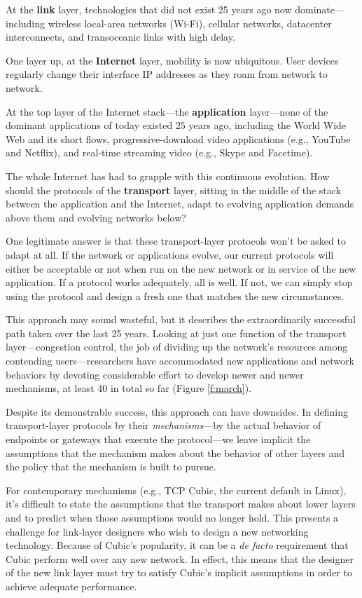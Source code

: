 At the \textbf{link} layer, technologies that did not exist 25 years
ago now dominate---including wireless local-area networks (Wi-Fi),
cellular networks, datacenter interconnects, and transoceanic links
with high delay.

One layer up, at the \textbf{Internet} layer, mobility is now
ubiquitous. User devices regularly change their interface IP addresses
as they roam from network to network.

At the top layer of the Internet stack---the \textbf{application}
layer---none of the dominant applications of today existed 25 years
ago, including the World Wide Web and its short flows,
progressive-download video applications (e.g., YouTube and Netflix),
and real-time streaming video (e.g., Skype and Facetime).

The whole Internet has had to grapple with this continuous
evolution. How should the protocols of the \textbf{transport} layer,
sitting in the middle of the stack between the application and the
Internet, adapt to evolving application demands above them and
evolving networks below?

One legitimate answer is that these transport-layer protocols won't be
asked to adapt at all. If the network or applications evolve, our
current protocols will either be acceptable or not when run on the new
network or in service of the new application. If a protocol works
adequately, all is well. If not, we can simply stop using the protocol
and design a fresh one that matches the new circumstances.

This approach may sound wasteful, but it describes the extraordinarily
successful path taken over the last 25 years. Looking at just one
function of the transport layer---congestion control, the job of
dividing up the network's resources among contending
users---researchers have accommodated new applications and network
behaviors by devoting considerable effort to develop newer and newer
mechanisms, at least 40 in total so far (Figure \ref{f:march}).

Despite its demonstrable success, this approach can have downsides. In
defining transport-layer protocols by their \emph{mechanisms}---by the
actual behavior of endpoints or gateways that execute the
protocol---we leave implicit the assumptions that the mechanism makes
about the behavior of other layers and the policy that the mechanism
is built to pursue.

For contemporary mechanisms (e.g., TCP Cubic, the current default in
Linux), it's difficult to state the assumptions that the transport
makes about lower layers and to predict when those assumptions would
no longer hold. This presents a challenge for link-layer designers who
wish to design a new networking technology. Because of Cubic's
popularity, it can be a \emph{de facto} requirement that Cubic perform
well over any new network. In effect, this means that the designer of
the new link layer must try to satisfy Cubic's implicit assumptions in
order to achieve adequate performance.

